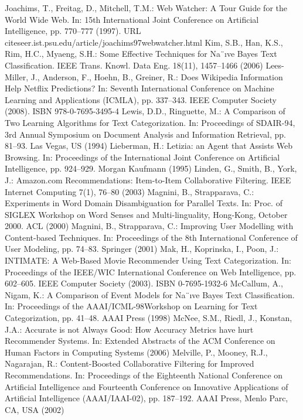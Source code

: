 \begin{thebibliography}{110}
Joachims, T., Freitag, D., Mitchell, T.M.: Web Watcher: A Tour Guide for the World Wide Web. In: 15th International Joint Conference on Artificial Intelligence, pp. 770–777 (1997). URL citeseer.ist.psu.edu/article/joachims97webwatcher.html
Kim, S.B., Han, K.S., Rim, H.C., Myaeng, S.H.: Some Effective Techniques for Na¨ıve Bayes Text Classification. IEEE Trans. Knowl. Data Eng. 18(11), 1457–1466 (2006)
Lees-Miller, J., Anderson, F., Hoehn, B., Greiner, R.: Does Wikipedia Information Help Netflix Predictions? In: Seventh International Conference on Machine Learning and Applications (ICMLA), pp. 337–343. IEEE Computer Society (2008). ISBN 978-0-7695-3495-4
Lewis, D.D., Ringuette, M.: A Comparison of Two Learning Algorithms for Text Categorization. In: Proceedings of SDAIR-94, 3rd Annual Symposium on Document Analysis and Information Retrieval, pp. 81–93. Las Vegas, US (1994)
Lieberman, H.: Letizia: an Agent that Assists Web Browsing. In: Proceedings of the International Joint Conference on Artificial Intelligence, pp. 924–929. Morgan Kaufmann (1995)
Linden, G., Smith, B., York, J.: Amazon.com Recommendations: Item-to-Item Collaborative Filtering. IEEE Internet Computing 7(1), 76–80 (2003)
Magnini, B., Strapparava, C.: Experiments in Word Domain Disambiguation for Parallel Texts. In: Proc. of SIGLEX Workshop on Word Senses and Multi-linguality, Hong-Kong, October 2000. ACL (2000)
Magnini, B., Strapparava, C.: Improving User Modelling with Content-based Techniques. In: Proceedings of the 8th International Conference of User Modeling, pp. 74–83. Springer (2001)
Mak, H., Koprinska, I., Poon, J.: INTIMATE: A Web-Based Movie Recommender Using Text Categorization. In: Proceedings of the IEEE/WIC International Conference on Web Intelligence, pp. 602–605. IEEE Computer Society (2003). ISBN 0-7695-1932-6
McCallum, A., Nigam, K.: A Comparison of Event Models for Na¨ıve Bayes Text Classification. In: Proceedings of the AAAI/ICML-98Workshop on Learning for Text Categorization, pp. 41–48. AAAI Press (1998)
McNee, S.M., Riedl, J., Konstan, J.A.: Accurate is not Always Good: How Accuracy Metrics have hurt Recommender Systems. In: Extended Abstracts of the ACM Conference on Human Factors in Computing Systems (2006)
Melville, P., Mooney, R.J., Nagarajan, R.: Content-Boosted Collaborative Filtering for Improved Recommendations. In: Proceedings of the Eighteenth National Conference on Artificial Intelligence and Fourteenth Conference on Innovative Applications of Artificial Intelligence (AAAI/IAAI-02), pp. 187–192. AAAI Press, Menlo Parc, CA, USA (2002)

\end{thebibliography}
